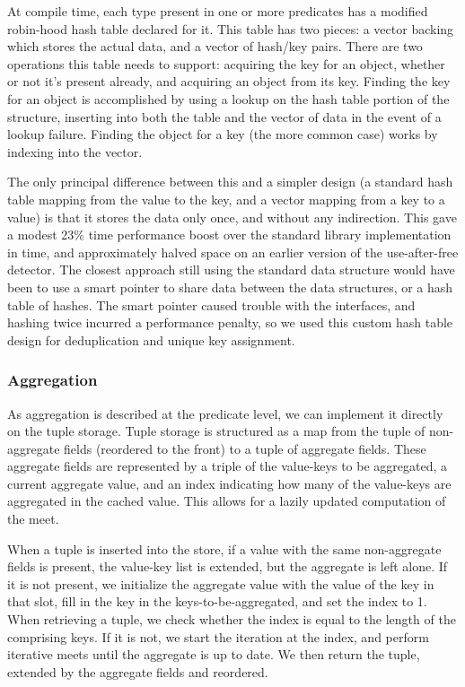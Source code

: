 At compile time, each type present in one or more predicates has a modified robin-hood hash table declared for it.
This table has two pieces: a vector backing which stores the actual data, and a vector of hash/key pairs.
There are two operations this table needs to support: acquiring the key for an object, whether or not it's present already, and acquiring an object from its key.
Finding the key for an object is accomplished by using a lookup on the hash table portion of the structure, inserting into both the table and the vector of data in the event of a lookup failure.
Finding the object for a key (the more common case) works by indexing into the vector.

The only principal difference between this and a simpler design (a standard hash table mapping from the value to the key, and a vector mapping from a key to a value) is that it stores the data only once, and without any indirection.
This gave a modest 23\% time performance boost over the standard library implementation in time, and approximately halved space on an earlier version of the use-after-free detector.
The closest approach still using the standard data structure would have been to use a smart pointer to share data between the data structures, or a hash table of hashes.
The smart pointer caused trouble with the interfaces, and hashing twice incurred a performance penalty, so we used this custom hash table design for deduplication and unique key assignment.

\subsubsection{Aggregation}
As aggregation is described at the predicate level, we can implement it directly on the tuple storage.
Tuple storage is structured as a map from the tuple of non-aggregate fields (reordered to the front) to a tuple of aggregate fields.
These aggregate fields are represented by a triple of the value-keys to be aggregated, a current aggregate value, and an index indicating how many of the value-keys are aggregated in the cached value.
This allows for a lazily updated computation of the meet.

When a tuple is inserted into the store, if a value with the same non-aggregate fields is present, the value-key list is extended, but the aggregate is left alone.
If it is not present, we initialize the aggregate value with the value of the key in that slot, fill in the key in the keys-to-be-aggregated, and set the index to 1.
When retrieving a tuple, we check whether the index is equal to the length of the comprising keys.
If it is not, we start the iteration at the index, and perform iterative meets until the aggregate is up to date.
We then return the tuple, extended by the aggregate fields and reordered.


